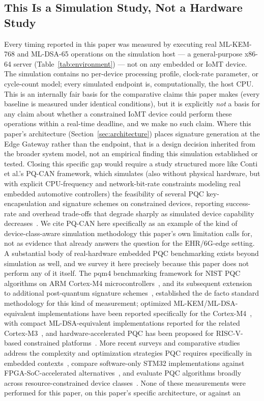 \documentclass[journal]{IEEEtran}
\begin{document}
\subsection{This Is a Simulation Study, Not a Hardware Study}

Every timing reported in this paper was measured by executing real ML-KEM-768 and ML-DSA-65 operations on the simulation host --- a general-purpose x86-64 server (Table~\ref{tab:environment}) --- not on any embedded or IoMT device. The simulation contains no per-device processing profile, clock-rate parameter, or cycle-count model; every simulated endpoint is, computationally, the host CPU. This is an internally fair basis for the comparative claims this paper makes (every baseline is measured under identical conditions), but it is explicitly \emph{not} a basis for any claim about whether a constrained IoMT device could perform these operations within a real-time deadline, and we make no such claim. Where this paper's architecture (Section~\ref{sec:architecture}) places signature generation at the Edge Gateway rather than the endpoint, that is a design decision inherited from the broader system model, not an empirical finding this simulation established or tested. Closing this specific gap would require a study structured more like Conti et al.'s PQ-CAN framework, which simulates (also without physical hardware, but with explicit CPU-frequency and network-bit-rate constraints modeling real embedded automotive controllers) the feasibility of several PQC key-encapsulation and signature schemes on constrained devices, reporting success-rate and overhead trade-offs that degrade sharply as simulated device capability decreases~\cite{conti2025pqcan}. We cite PQ-CAN here specifically as an example of the kind of device-class-aware simulation methodology this paper's own limitation calls for, not as evidence that already answers the question for the EHR/6G-edge setting. A substantial body of real-hardware embedded PQC benchmarking exists beyond simulation as well, and we survey it here precisely because this paper does not perform any of it itself. The pqm4 benchmarking framework for NIST PQC algorithms on ARM Cortex-M4 microcontrollers~\cite{kannwischer2019pqm4}, and its subsequent extension to additional post-quantum signature schemes~\cite{pqm4update2024}, established the de facto standard methodology for this kind of measurement; optimized ML-KEM/ML-DSA-equivalent implementations have been reported specifically for the Cortex-M4~\cite{fasterkyberdilithiumm42022}, with compact ML-DSA-equivalent implementations reported for the related Cortex-M3~\cite{compactdilithiumm3m42020}, and hardware-accelerated PQC has been proposed for RISC-V-based constrained platforms~\cite{risqv2020}. More recent surveys and comparative studies address the complexity and optimization strategies PQC requires specifically in embedded contexts~\cite{embeddedpqccomplexity2025}, compare software-only STM32 implementations against FPGA-SoC-accelerated alternatives~\cite{stm32fpgacomparison2026}, and evaluate PQC algorithms broadly across resource-constrained device classes~\cite{resourceconstrainedpqceval2025}. None of these measurements were performed for this paper, on this paper's specific architecture, or against an 
\end{document}
